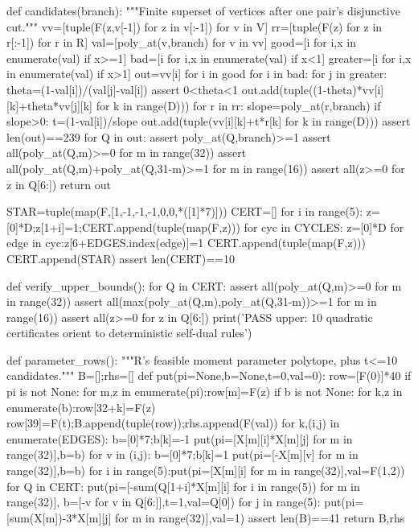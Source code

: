 \documentclass[UTF8,11pt,a4paper]{ctexart}
\begin{document}
\begin{CodeListing}
def candidates(branch):
    """Finite superset of vertices after one pair's disjunctive cut."""
    vv=[tuple(F(z,v[-1]) for z in v[:-1]) for v in V]
    rr=[tuple(F(z) for z in r[:-1]) for r in R]
    val=[poly_at(v,branch) for v in vv]
    good=[i for i,x in enumerate(val) if x>=1]
    bad=[i for i,x in enumerate(val) if x<1]
    greater=[i for i,x in enumerate(val) if x>1]
    out={vv[i] for i in good}
    for i in bad:
        for j in greater:
            theta=(1-val[i])/(val[j]-val[i])
            assert 0<theta<1
            out.add(tuple((1-theta)*vv[i][k]+theta*vv[j][k] for k in range(D)))
        for r in rr:
            slope=poly_at(r,branch)
            if slope>0:
                t=(1-val[i])/slope
                out.add(tuple(vv[i][k]+t*r[k] for k in range(D)))
    assert len(out)==239
    for Q in out:
        assert poly_at(Q,branch)>=1
        assert all(poly_at(Q,m)>=0 for m in range(32))
        assert all(poly_at(Q,m)+poly_at(Q,31-m)>=1 for m in range(16))
        assert all(z>=0 for z in Q[6:])
    return out

STAR=tuple(map(F,[1,-1,-1,-1,0,0,*([1]*7)]))
CERT=[]
for i in range(5):
    z=[0]*D;z[1+i]=1;CERT.append(tuple(map(F,z)))
for cyc in CYCLES:
    z=[0]*D
    for edge in cyc:z[6+EDGES.index(edge)]=1
    CERT.append(tuple(map(F,z)))
CERT.append(STAR)
assert len(CERT)==10


def verify_upper_bounds():
    for Q in CERT:
        assert all(poly_at(Q,m)>=0 for m in range(32))
        assert all(max(poly_at(Q,m),poly_at(Q,31-m))>=1 for m in range(16))
        assert all(z>=0 for z in Q[6:])
    print('PASS upper: 10 quadratic certificates orient to deterministic self-dual rules')


def parameter_rows():
    """R's feasible moment parameter polytope, plus t<=10 candidates."""
    B=[];rhs=[]
    def put(pi=None,b=None,t=0,val=0):
        row=[F(0)]*40
        if pi is not None:
            for m,z in enumerate(pi):row[m]=F(z)
        if b is not None:
            for k,z in enumerate(b):row[32+k]=F(z)
        row[39]=F(t);B.append(tuple(row));rhs.append(F(val))
    for k,(i,j) in enumerate(EDGES):
        b=[0]*7;b[k]=-1
        put(pi=[X[m][i]*X[m][j] for m in range(32)],b=b)
        for v in (i,j):
            b=[0]*7;b[k]=1
            put(pi=[-X[m][v] for m in range(32)],b=b)
    for i in range(5):put(pi=[X[m][i] for m in range(32)],val=F(1,2))
    for Q in CERT:
        put(pi=[-sum(Q[1+i]*X[m][i] for i in range(5)) for m in range(32)],
            b=[-v for v in Q[6:]],t=1,val=Q[0])
    for j in range(5):
        put(pi=[sum(X[m])-3*X[m][j] for m in range(32)],val=1)
    assert len(B)==41
    return B,rhs



\end{CodeListing}
\end{document}
